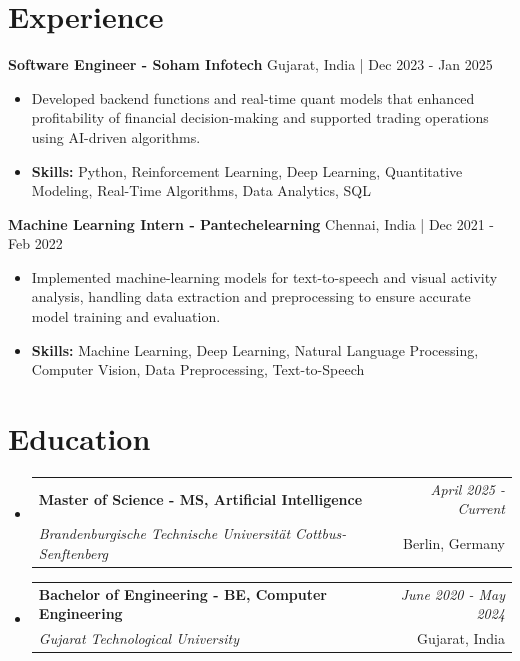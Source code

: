 \documentclass[a4paper,11pt]{article}
\makeatletter
\newcommand{\resumeSubheading}[4]{
\vspace{0.5mm}\item
    \begin{tabular*}{0.98\textwidth}[t]{l@{\extracolsep{\fill}}r}
        \textbf{#1} & \textit{\footnotesize{#4}} \\
        \textit{\footnotesize{#3}} &  \footnotesize{#2}\\
    \end{tabular*}
    \vspace{-2.4mm}
}
\makeatother
\begin{document}
\section{\textbf{Experience}}


\vspace{1mm}
  \textbf{Software Engineer - Soham Infotech} \hfill Gujarat, India | Dec 2023 - Jan 2025
\vspace{-1.5mm} %
\begin{itemize}
  \item Developed backend functions and real-time quant models that enhanced profitability of financial decision-making and supported trading operations using AI-driven algorithms.

\vspace{-2mm}
  \item \textbf{Skills:} Python, Reinforcement Learning, Deep Learning, Quantitative Modeling, Real-Time Algorithms, Data Analytics, SQL
\end{itemize}

\vspace{1mm}
  \textbf{Machine Learning Intern - Pantechelearning} \hfill Chennai, India | Dec 2021 - Feb 2022
\vspace{-1.5mm} %
\begin{itemize}
  \item Implemented machine-learning models for text-to-speech and visual activity analysis, handling data extraction and preprocessing to ensure accurate model training and evaluation.
\vspace{-2mm}
  \item \textbf{Skills:} Machine Learning, Deep Learning, Natural Language Processing, Computer Vision, Data Preprocessing, Text-to-Speech
\end{itemize}\section{\textbf{Education}}
\vspace{-0.4mm}

\begin{itemize}
\resumeSubheading
{Master of Science - MS, Artificial Intelligence }{Berlin, Germany}
{Brandenburgische Technische Universität Cottbus-Senftenberg  }{April 2025 - Current}

\vspace{1.0mm} %
\resumeSubheading
{Bachelor of Engineering - BE, Computer Engineering  }{Gujarat, India}
{Gujarat Technological University }{June 2020 - May 2024}

\end{itemize}
\end{document}
